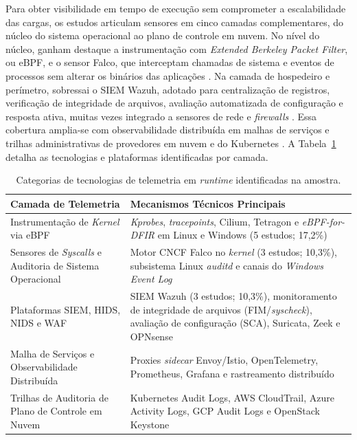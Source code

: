 Para obter visibilidade em tempo de execução sem comprometer a escalabilidade das cargas, os estudos articulam sensores em cinco camadas complementares, do núcleo do sistema operacional ao plano de controle em nuvem. No nível do núcleo, ganham destaque a instrumentação com \textit{Extended Berkeley Packet Filter}, ou eBPF, e o sensor Falco, que interceptam chamadas de sistema e eventos de processos sem alterar os binários das aplicações \cite{jin2025,joshisegireddy2026,kalafatidis2025,shao2026a,zhang2025}. Na camada de hospedeiro e perímetro, sobressai o SIEM Wazuh, adotado para centralização de registros, verificação de integridade de arquivos, avaliação automatizada de configuração e resposta ativa, muitas vezes integrado a sensores de rede e \textit{firewalls} \cite{acosta2025,bungei2026,setiawan2025,sasmito2025}. Essa cobertura amplia-se com observabilidade distribuída em malhas de serviços e trilhas administrativas de provedores em nuvem e do Kubernetes \cite{aftab2026,devarajulu2025,torkura2021,kumar2026}. A Tabela~\ref{tab:rsl_qs03} detalha as tecnologias e plataformas identificadas por camada.

\begin{table}[!htbp]
    \centering
    \caption{Categorias de tecnologias de telemetria em \textit{runtime} identificadas na amostra.}
    \label{tab:rsl_qs03}
    \footnotesize
    \begin{tabular}{p{4.8cm}p{9.2cm}}
        \hline
        \textbf{Camada de Telemetria} & \textbf{Mecanismos Técnicos Principais} \\ \hline
        Instrumentação de \textit{Kernel} via eBPF & \textit{Kprobes}, \textit{tracepoints}, Cilium, Tetragon e \textit{eBPF-for-DFIR} em Linux e Windows (5 estudos; 17,2\%) \\ \hline
        Sensores de \textit{Syscalls} e Auditoria de Sistema Operacional & Motor CNCF Falco no \textit{kernel} (3 estudos; 10,3\%), subsistema Linux \textit{auditd} e canais do \textit{Windows Event Log} \\ \hline
        Plataformas SIEM, HIDS, NIDS e WAF & SIEM Wazuh (3 estudos; 10,3\%), monitoramento de integridade de arquivos (FIM/\textit{syscheck}), avaliação de configuração (SCA), Suricata, Zeek e OPNsense \\ \hline
        Malha de Serviços e Observabilidade Distribuída & Proxies \textit{sidecar} Envoy/Istio, OpenTelemetry, Prometheus, Grafana e rastreamento distribuído \\ \hline
        Trilhas de Auditoria de Plano de Controle em Nuvem & Kubernetes Audit Logs, AWS CloudTrail, Azure Activity Logs, GCP Audit Logs e OpenStack Keystone \\ \hline
    \end{tabular}
\end{table}
\FloatBarrier

